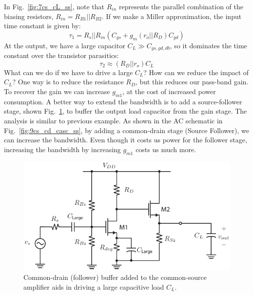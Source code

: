 In Fig.~\ref{fig:7cs_cL_ss}, note that $R_{in}$ represents the parallel combination of the biasing resistors, $R_{in} = R_{B1} || R_{B2}$.  If we make a Miller approximation, the input time constant is given by:
    \begin{equation}
        \tau_1 = R_s || R_{in} (C_{gs} + g_m (r_o||R_D) C_{gd} )
    \end{equation}
At the output, we have a large capacitor $C_L \gg C_{gs,gd,db}$, so it dominates the time constant over the transistor parasitics:
    \begin{equation}
        \tau_2 \approx (R_D|| r_o) C_L 
    \end{equation}
What can we do if we have to drive a large $C_L$?  How can we reduce the impact of $C_L$? One way is to reduce the resistance $R_D$, but this reduces our pass-band gain.   To recover the gain we can increase $g_{m1}$, at the cost of increased power consumption.   A better way to extend the bandwidth is to add a source-follower stage, shown Fig.~\ref{fig:8_cs_cd_casc_dc}, to buffer the output load capacitor from the gain stage.  The analysis is similar to previous example.  As shown in the AC schematic in Fig.~\ref{fig:9cs_cd_casc_ss}, by adding a common-drain stage (Source Follower), we can increase the bandwidth. Even though it costs us power for the follower stage, increasing the bandwidth by increasing $g_{m1}$ costs us much more.
\begin{figure}[tb]
\centering
\includegraphics[scale=1]{8_cs_cd_casc_dc}
\caption{Common-drain (follower) buffer added to the common-source amplifier aids in driving a large capacitive load $C_L$.}
\label{fig:8_cs_cd_casc_dc}
\end{figure}
